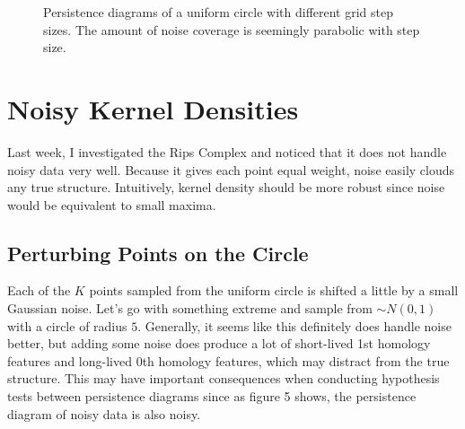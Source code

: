 \documentclass[a4paper]{article}
\begin{document}
\begin{figure}[htb!]
\begin{subfigure}{.32\textwidth}
\end{subfigure}
\caption{Persistence diagrams of a uniform circle with different grid step sizes. The amount of noise coverage is seemingly parabolic with step size.}
\end{figure}

\section{Noisy Kernel Densities}
Last week, I investigated the Rips Complex and noticed that it does not handle noisy data very well. Because it gives each point equal weight, noise easily clouds any true structure. Intuitively, kernel density should be more robust since noise would be equivalent to small maxima. 

\subsection{Perturbing Points on the Circle}
Each of the $K$ points sampled from the uniform circle is shifted a little by a small Gaussian noise. Let's go with something extreme and sample from $\sim N(0, 1)$ with a circle of radius $5$. Generally, it seems like this definitely does handle noise better, but adding some noise does produce a lot of short-lived 1st  homology features and long-lived 0th homology features, which may distract from the true structure. This may have important consequences when conducting hypothesis tests between persistence diagrams since as figure 5 shows, the persistence diagram of noisy data is also noisy.
\end{document}
